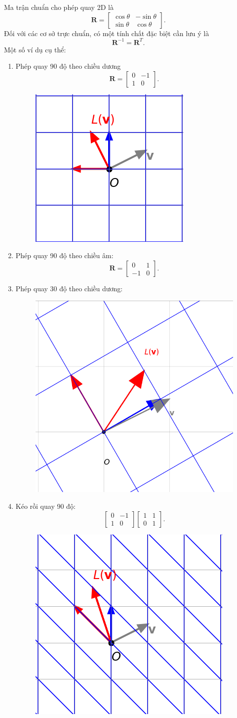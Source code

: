 Ma trận chuẩn cho phép quay 2D là 
\[\mathbf{R}=\begin{bmatrix}
    \cos\theta &-\sin\theta\\
    \sin\theta &\cos\theta
\end{bmatrix}.\] Đối với các cơ sở trực chuẩn, có một tính chất đặc biệt cần lưu ý là 
\[\mathbf{R}^{-1}=\mathbf{R}^T .\] Một số ví dụ cụ thể:
\begin{enumerate}
    \item Phép quay 90 độ theo chiều dương \[\mathbf{R}=\begin{bmatrix}
        0&-1\\1&0
    \end{bmatrix}.\]
    \begin{figure}[H]
        \centering
        \includegraphics[width=0.3\linewidth]{Tuan2/Figures/LT7.png}
    \end{figure}
    \item Phép quay 90 độ theo chiều âm: \[\mathbf{R}=\begin{bmatrix}
        0&1\\-1&0
    \end{bmatrix}.\]
    \item Phép quay 30 độ theo chiều dương: \begin{figure}[H]
        \centering
        \includegraphics[width=0.3\linewidth]{Tuan2/Figures/LT8.png}
    \end{figure}
    \item Kéo rồi quay 90 độ:
    \[\begin{bmatrix}
        0&-1\\1&0
    \end{bmatrix}\begin{bmatrix}
        1&1\\0&1
    \end{bmatrix}.\] \begin{figure}[H]
        \centering
        \includegraphics[width=0.3\linewidth]{Tuan2/Figures/LT9.png}
    \end{figure}
\end{enumerate}

